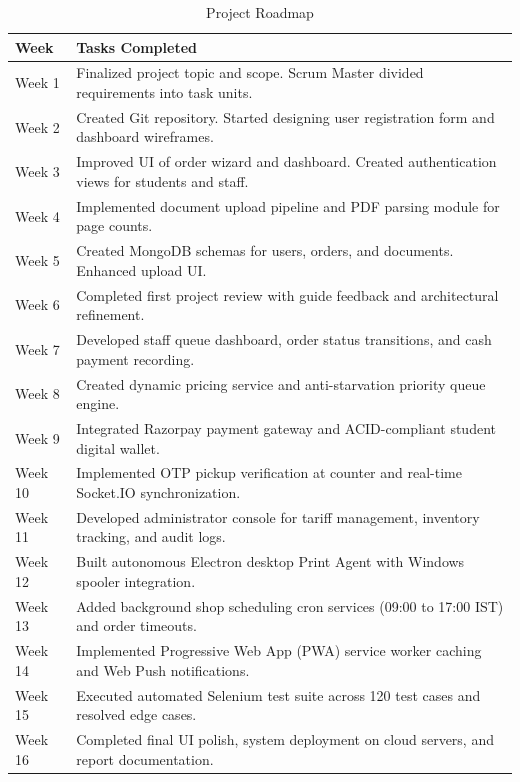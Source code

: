 \documentclass[12pt,a4paper]{report}
\begin{document}
\begin{table}[H]
\centering
\small
\caption{Project Roadmap}
\label{tab:roadmap}
\begin{tabular}{|p{0.8in}|p{4.6in}|}
\hline
\textbf{Week} & \textbf{Tasks Completed} \\ \hline
Week 1 & Finalized project topic and scope. Scrum Master divided requirements into task units. \\ \hline
Week 2 & Created Git repository. Started designing user registration form and dashboard wireframes. \\ \hline
Week 3 & Improved UI of order wizard and dashboard. Created authentication views for students and staff. \\ \hline
Week 4 & Implemented document upload pipeline and PDF parsing module for page counts. \\ \hline
Week 5 & Created MongoDB schemas for users, orders, and documents. Enhanced upload UI. \\ \hline
Week 6 & Completed first project review with guide feedback and architectural refinement. \\ \hline
Week 7 & Developed staff queue dashboard, order status transitions, and cash payment recording. \\ \hline
Week 8 & Created dynamic pricing service and anti-starvation priority queue engine. \\ \hline
Week 9 & Integrated Razorpay payment gateway and ACID-compliant student digital wallet. \\ \hline
Week 10 & Implemented OTP pickup verification at counter and real-time Socket.IO synchronization. \\ \hline
Week 11 & Developed administrator console for tariff management, inventory tracking, and audit logs. \\ \hline
Week 12 & Built autonomous Electron desktop Print Agent with Windows spooler integration. \\ \hline
Week 13 & Added background shop scheduling cron services (09:00 to 17:00 IST) and order timeouts. \\ \hline
Week 14 & Implemented Progressive Web App (PWA) service worker caching and Web Push notifications. \\ \hline
Week 15 & Executed automated Selenium test suite across 120 test cases and resolved edge cases. \\ \hline
Week 16 & Completed final UI polish, system deployment on cloud servers, and report documentation. \\ \hline
\end{tabular}
\end{table}
\end{document}
